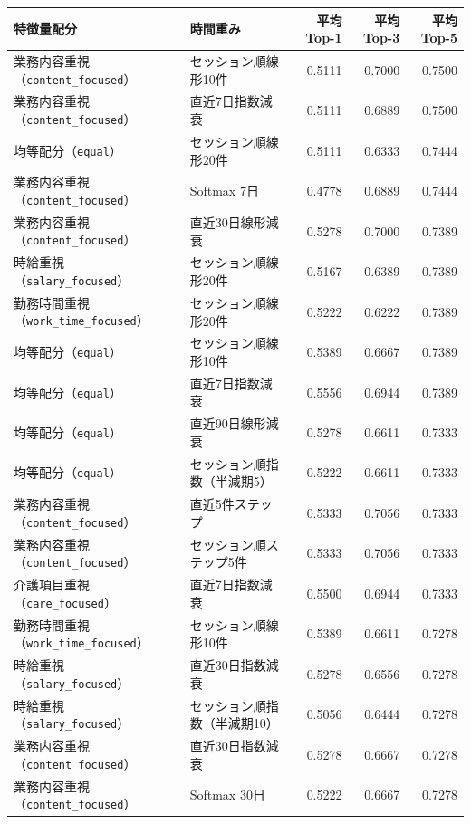 \begin{tabularx}{\linewidth}{X X r r r}
\hline
特徴量配分 & 時間重み & 平均Top-1 & 平均Top-3 & 平均Top-5 \\
\hline
業務内容重視（\texttt{content\_focused}） & セッション順線形10件 & 0.5111 & 0.7000 & 0.7500 \\
業務内容重視（\texttt{content\_focused}） & 直近7日指数減衰 & 0.5111 & 0.6889 & 0.7500 \\
均等配分（\texttt{equal}） & セッション順線形20件 & 0.5111 & 0.6333 & 0.7444 \\
業務内容重視（\texttt{content\_focused}） & Softmax 7日 & 0.4778 & 0.6889 & 0.7444 \\
業務内容重視（\texttt{content\_focused}） & 直近30日線形減衰 & 0.5278 & 0.7000 & 0.7389 \\
時給重視（\texttt{salary\_focused}） & セッション順線形20件 & 0.5167 & 0.6389 & 0.7389 \\
勤務時間重視（\texttt{work\_time\_focused}） & セッション順線形20件 & 0.5222 & 0.6222 & 0.7389 \\
均等配分（\texttt{equal}） & セッション順線形10件 & 0.5389 & 0.6667 & 0.7389 \\
均等配分（\texttt{equal}） & 直近7日指数減衰 & 0.5556 & 0.6944 & 0.7389 \\
均等配分（\texttt{equal}） & 直近90日線形減衰 & 0.5278 & 0.6611 & 0.7333 \\
均等配分（\texttt{equal}） & セッション順指数（半減期5） & 0.5222 & 0.6611 & 0.7333 \\
業務内容重視（\texttt{content\_focused}） & 直近5件ステップ & 0.5333 & 0.7056 & 0.7333 \\
業務内容重視（\texttt{content\_focused}） & セッション順ステップ5件 & 0.5333 & 0.7056 & 0.7333 \\
介護項目重視（\texttt{care\_focused}） & 直近7日指数減衰 & 0.5500 & 0.6944 & 0.7333 \\
勤務時間重視（\texttt{work\_time\_focused}） & セッション順線形10件 & 0.5389 & 0.6611 & 0.7278 \\
時給重視（\texttt{salary\_focused}） & 直近30日指数減衰 & 0.5278 & 0.6556 & 0.7278 \\
時給重視（\texttt{salary\_focused}） & セッション順指数（半減期10） & 0.5056 & 0.6444 & 0.7278 \\
業務内容重視（\texttt{content\_focused}） & 直近30日指数減衰 & 0.5278 & 0.6667 & 0.7278 \\
業務内容重視（\texttt{content\_focused}） & Softmax 30日 & 0.5222 & 0.6667 & 0.7278 \\

\end{tabularx}
